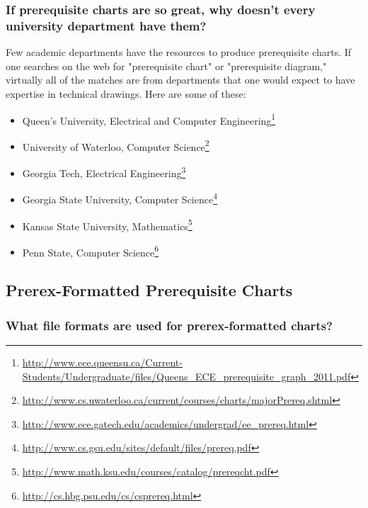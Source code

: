 \documentclass[11pt]{article}
\newcommand{\myurl}[1]{\textcolor{blue}{\underline{\textcolor{black}{\url{#1}}}}}
\begin{document}
\subsubsection*{If prerequisite charts are so great, why doesn't every university department have them?}
Few academic departments have the resources to produce prerequisite charts. If
one searches on the web for "prerequisite chart" or "prerequisite diagram," 
virtually all of the matches are from departments that one would
expect to have expertise in technical drawings.
Here are some of these:
\begin{itemize}
\item Queen's University, Electrical and Computer Engineering\footnote{%
\myurl{http://www.ece.queensu.ca/Current-Students/Undergraduate/files/Queens_ECE_prerequisite_graph_2011.pdf}}
\item University of Waterloo, Computer Science\footnote{%
\myurl{http://www.cs.uwaterloo.ca/current/courses/charts/majorPrereq.shtml}}
\item Georgia Tech, Electrical Engineering\footnote{%
\myurl{http://www.ece.gatech.edu/academics/undergrad/ee_prereq.html}}
\item Georgia State University, Computer Science\footnote{%
\myurl{http://www.cs.gsu.edu/sites/default/files/prereq.pdf}}
\item Kansas State University, Mathematics\footnote{%
\myurl{http://www.math.ksu.edu/courses/catalog/prereqcht.pdf}}
\item Penn State, Computer Science\footnote{%
\myurl{http://cs.hbg.psu.edu/cs/csprereq.html}}
\end{itemize}

\subsection{Prerex-Formatted  Prerequisite Charts}

\subsubsection*{What file formats are used for prerex-formatted charts?}
\end{document}

